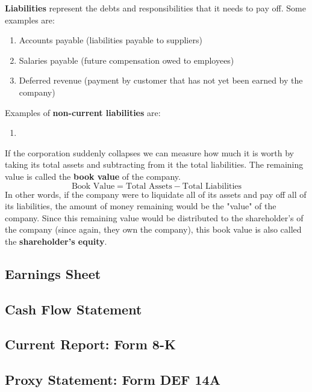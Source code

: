 \documentclass{article}
\begin{document}
    \begin{definition}[Liabilities]
      \textbf{Liabilities} represent the debts and responsibilities that it needs to pay off. Some examples are: 
      \begin{enumerate}
        \item Accounts payable (liabilities payable to suppliers) 
        \item Salaries payable (future compensation owed to employees)
        \item Deferred revenue (payment by customer that has not yet been earned by the company) 
      \end{enumerate}
      Examples of \textbf{non-current liabilities} are: 
      \begin{enumerate}
          \item 
      \end{enumerate}
    \end{definition}

    \begin{definition}
      If the corporation suddenly collapses we can measure how much it is worth by taking its total assets and subtracting from it the total liabilities. The remaining value is called the \textbf{book value} of the company. 
      \[\text{Book Value} = \text{Total Assets} - \text{Total Liabilities}\]
      In other words, if the company were to liquidate all of its assets and pay off all of its liabilities, the amount of money remaining would be the "value" of the company. Since this remaining value would be distributed to the shareholder's of the company (since again, they own the company), this book value is also called the \textbf{shareholder's equity}. 
    \end{definition}

  \subsection{Earnings Sheet}

  \subsection{Cash Flow Statement}

  \subsection{Current Report: Form 8-K}

  \subsection{Proxy Statement: Form DEF 14A}
\end{document}
